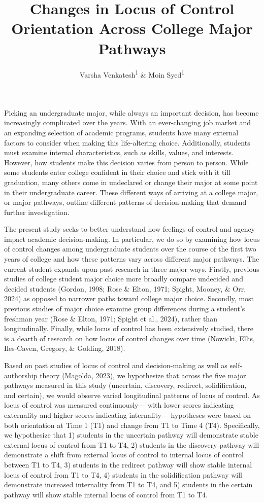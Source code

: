 \documentclass[
  english,
  man,floatsintext]{apa6}
\title{Changes in Locus of Control Orientation Across College Major Pathways}
\author{Varsha Venkatesh\textsuperscript{1} \& Moin Syed\textsuperscript{1}}
\date{}
\affiliation{\vspace{0.5cm}\textsuperscript{1} University of Minnesota}
\begin{document}
\maketitle

Picking an undergraduate major, while always an important decision, has become increasingly complicated over the years. With an ever-changing job market and an expanding selection of academic programs, students have many external factors to consider when making this life-altering choice. Additionally, students must examine internal characteristics, such as skills, values, and interests. However, how students make this decision varies from person to person. While some students enter college confident in their choice and stick with it till graduation, many others come in undeclared or change their major at some point in their undergraduate career. These different ways of arriving at a college major, or major pathways, outline different patterns of decision-making that demand further investigation.

The present study seeks to better understand how feelings of control and agency impact academic decision-making. In particular, we do so by examining how locus of control changes among undergraduate students over the course of the first two years of college and how these patterns vary across different major pathways. The current student expands upon past research in three major ways. Firstly, previous studies of college student major choice more broadly compare undecided and decided students (Gordon, 1998; Rose \& Elton, 1971; Spight, Mooney, \& Orr, 2024) as opposed to narrower paths toward college major choice. Secondly, most previous studies of major choice examine group differences during a student's freshman year (Rose \& Elton, 1971; Spight et al., 2024), rather than longitudinally. Finally, while locus of control has been extensively studied, there is a dearth of research on how locus of control changes over time (Nowicki, Ellis, Iles-Caven, Gregory, \& Golding, 2018).

Based on past studies of locus of control and decision-making as well as self-authorship theory (Magolda, 2023), we hypothesize that across the five major pathways measured in this study (uncertain, discovery, redirect, solidification, and certain), we would observe varied longitudinal patterns of locus of control. As locus of control was measured continuously--- with lower scores indicating externality and higher scores indicating internality--- hypotheses were based on both orientation at Time 1 (T1) and change from T1 to Time 4 (T4). Specifically, we hypothesize that 1) students in the uncertain pathway will demonstrate stable external locus of control from T1 to T4, 2) students in the discovery pathway will demonstrate a shift from external locus of control to internal locus of control between T1 to T4, 3) students in the redirect pathway will show stable internal locus of control from T1 to T4, 4) students in the solidification pathway will demonstrate increased internality from T1 to T4, and 5) students in the certain pathway will show stable internal locus of control from T1 to T4.
\end{document}
